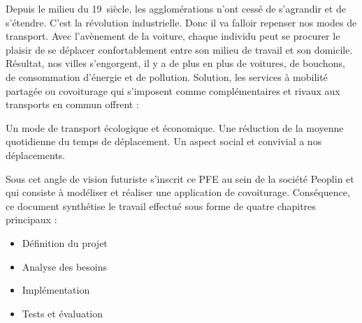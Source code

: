 
\begin{general}

\hspace{1cm}Depuis le milieu du 19\ieme\ siècle, les agglomérations n’ont cessé de s’agrandir et de s’étendre. C’est la révolution industrielle. Donc il va falloir repenser nos modes de transport.\newline
Avec l’avènement de la voiture, chaque individu peut se procurer le plaisir de se déplacer confortablement entre son milieu de travail et son domicile.\newline
Résultat, nos villes s’engorgent, il y a de plus en plus de voitures, de bouchons, de consommation d’énergie et de pollution.\newline
Solution, les services à mobilité partagée ou covoiturage qui s’imposent comme complémentaires et rivaux aux transports en commun offrent :
\begin{itemize}
\itemb Un mode de transport écologique et économique.
\itemb Une réduction de la moyenne quotidienne du temps de déplacement.
\itemb Un aspect social et convivial a nos déplacements.
\end{itemize}
Sous cet angle de vision futuriste s’inscrit ce PFE au sein de la société Peoplin et qui consiste à modéliser et réaliser une application de covoiturage.\newline
Conséquence, ce document synthétise le travail effectué sous forme de quatre chapitres principaux :
\begin{itemize}
	\item Définition du projet
	\item Analyse des besoins
	\item Implémentation
	\item Tests et évaluation
\end{itemize}

\end{general}
